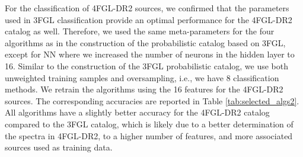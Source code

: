 For the classification of 4FGL-DR2 sources, we confirmed that the parameters used in 3FGL classification provide an optimal performance for the 4FGL-DR2 catalog as well.
Therefore, we used the same meta-parameters for the four algorithms as in the construction of the probabilistic catalog based on 3FGL, except for NN where we increased the number of neurons in the hidden layer to 16. Similar to the construction of the 3FGL probabilistic catalog, we use both unweighted training samples and oversampling, i.e., we have 8 classification methods.
We retrain the algorithms using the 16 features for the 4FGL-DR2 sources.
The corresponding accuracies are reported in Table \ref{tab:selected_algs2}.
All algorithms have a slightly better accuracy for the 4FGL-DR2 catalog compared to the 3FGL catalog, which is likely due to a better determination of the spectra in 4FGL-DR2, to a higher number of features, and more associated sources used as training data. 


